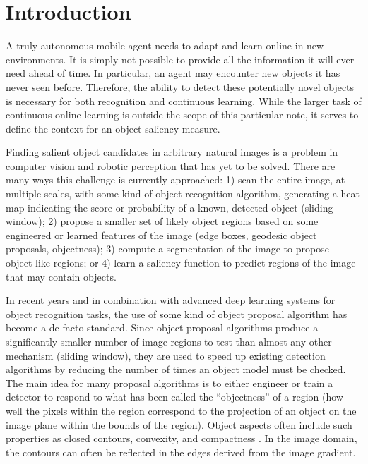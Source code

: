 \section{Introduction}
\label{sec:intro}
A truly autonomous mobile agent needs to adapt and learn online in new environments. It is simply not possible to provide all the information it will ever need ahead of time. In particular, an agent may encounter new objects it has never seen before. Therefore, the ability to detect these potentially novel objects is necessary for both recognition and continuous learning. While the larger task of continuous online learning is outside the scope of this particular note, it serves to define the context for an object saliency measure.

Finding salient object candidates in arbitrary natural images is a problem in computer vision and robotic perception that has yet to be solved. There are many ways this challenge is currently approached: 1) scan the entire image, at multiple scales, with some kind of object recognition algorithm, generating a heat map indicating the score or probability of a known, detected object (\eg sliding window); 2) propose a smaller set of likely object regions based on some engineered or learned features of the image (\eg edge boxes\cite{zitnick_edge_2014}, geodesic object proposals\cite{krahenbuhl_geodesic_2014}, objectness\cite{alexe_measuring_2012}); 3) compute a segmentation of the image to propose object-like regions; or 4) learn a saliency function to predict regions of the image that may contain objects.

In recent years and in combination with advanced deep learning systems for object recognition tasks, the use of some kind of object proposal algorithm has become a de facto standard. Since object proposal algorithms produce a significantly smaller number of image regions to test than almost any other mechanism (\eg sliding window), they are used to speed up existing detection algorithms by reducing the number of times an object model must be checked. The main idea for many proposal algorithms is to either engineer or train a detector to respond to what has been called the ``objectness'' of a region (\ie how well the pixels within the region correspond to the projection of an object on the image plane within the bounds of the region). Object aspects often include such properties as closed contours, convexity, and compactness \cite{koffka_principles_1935}. In the image domain, the contours can often be reflected in the edges derived from the image gradient.

